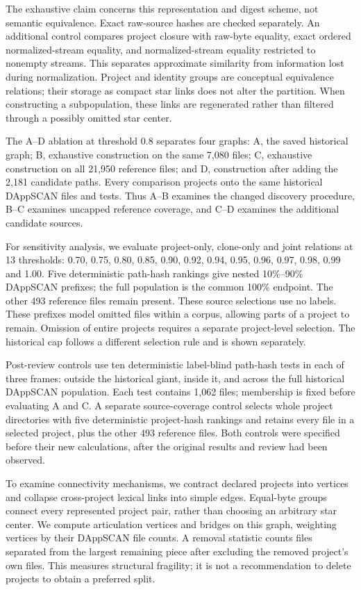 \documentclass[preprint,12pt]{elsarticle}
\begin{document}
The exhaustive claim concerns this representation and digest scheme, not semantic equivalence. Exact raw-source hashes are checked separately. An additional control compares project closure with raw-byte equality, exact ordered normalized-stream equality, and normalized-stream equality restricted to nonempty streams. This separates approximate similarity from information lost during normalization. Project and identity groups are conceptual equivalence relations; their storage as compact star links does not alter the partition. When constructing a subpopulation, these links are regenerated rather than filtered through a possibly omitted star center.

The A--D ablation at threshold 0.8 separates four graphs: A, the saved historical graph; B, exhaustive construction on the same 7,080 files; C, exhaustive construction on all 21,950 reference files; and D, construction after adding the 2,181 candidate paths. Every comparison projects onto the same historical DAppSCAN files and tests. Thus A--B examines the changed discovery procedure, B--C examines uncapped reference coverage, and C--D examines the additional candidate sources.

For sensitivity analysis, we evaluate project-only, clone-only and joint relations at 13 thresholds: 0.70, 0.75, 0.80, 0.85, 0.90, 0.92, 0.94, 0.95, 0.96, 0.97, 0.98, 0.99 and 1.00. Five deterministic path-hash rankings give nested 10\%--90\% DAppSCAN prefixes; the full population is the common 100\% endpoint. The other 493 reference files remain present. These source selections use no labels. These prefixes model omitted files within a corpus, allowing parts of a project to remain. Omission of entire projects requires a separate project-level selection. The historical cap follows a different selection rule and is shown separately.

Post-review controls use ten deterministic label-blind path-hash tests in each of three frames: outside the historical giant, inside it, and across the full historical DAppSCAN population. Each test contains 1,062 files; membership is fixed before evaluating A and C. A separate source-coverage control selects whole project directories with five deterministic project-hash rankings and retains every file in a selected project, plus the other 493 reference files. Both controls were specified before their new calculations, after the original results and review had been observed.

To examine connectivity mechanisms, we contract declared projects into vertices and collapse cross-project lexical links into simple edges. Equal-byte groups connect every represented project pair, rather than choosing an arbitrary star center. We compute articulation vertices and bridges on this graph, weighting vertices by their DAppSCAN file counts. A removal statistic counts files separated from the largest remaining piece after excluding the removed project's own files. This measures structural fragility; it is not a recommendation to delete projects to obtain a preferred split.
\end{document}
